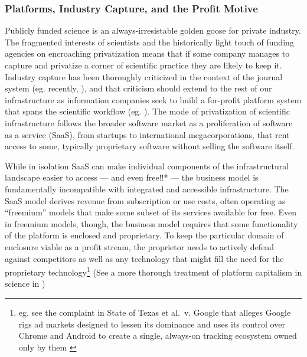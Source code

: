 \documentclass[10pt]{article}
\begin{document}
\begin{multicols}{2}
{\subsubsection{Platforms, Industry Capture, and the Profit
Motive}\label{platforms-industry-capture-and-the-profit-motive}}

Publicly funded science is an always-irresistable golden goose for
private industry. The fragmented interests of scientists and the
historically light touch of funding agencies on encroaching
privatization means that if some company manages to capture and
privatize a corner of scientific practice they are likely to keep it.
Industry capture has been thoroughly criticized in the context of the
journal system (eg. recently, \cite{brembsReplacingAcademicJournals2021} ), and that criticism should
extend to the rest of our infrastructure as information companies seek
to build a for-profit platform system that spans the scientific workflow
(eg. \cite{ElsevierSevenBridges2017} ). The mode of privatization
of scientific infrastructure follows the broader software market as a
proliferation of software as a service (SaaS), from startups to
international megacorporations, that rent access to some, typically
proprietary software without selling the software itself.

While in isolation SaaS can make individual components of the
infrastructural landscape easier to access --- and even free!!* --- the
business model is fundamentally incompatible with integrated and
accessible infrastructure. The SaaS model derives revenue from
subscription or use costs, often operating as ``freemium'' models that
make some subset of its services available for free. Even in freemium
models, though, the business model requires that some functionality of
the platform is enclosed and proprietary. To keep the particular domain
of enclosure viable as a profit stream, the proprietor needs to actively
defend against competitors as well as any technology that might fill the
need for the proprietary technology\footnote{eg. see the complaint in
  State of Texas et al.~v. Google that alleges Google rigs ad markets
  designed to lessen its dominance and uses its control over Chrome and
  Android to create a single, always-on tracking ecosystem owned only by
  them \cite{ReGoogleDigital2021} } (See a more thorough
treatment of platform capitalism in science in \cite{mirowskiFutureOpenScience2018} )


\end{multicols}
\end{document}
